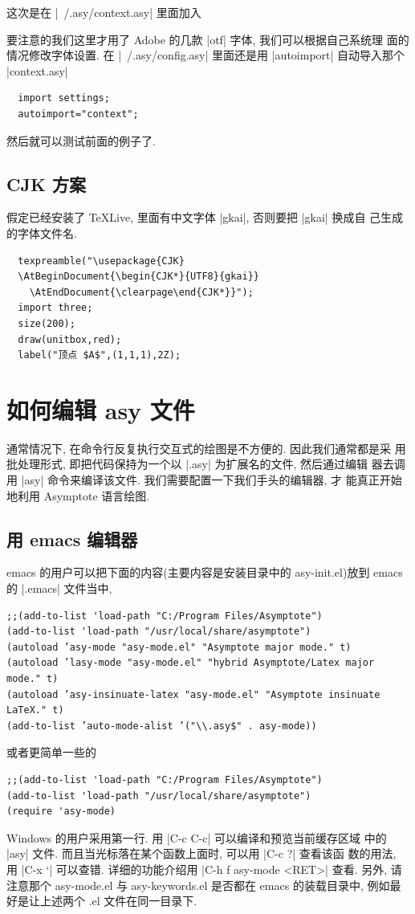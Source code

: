 \documentclass[nofonts,CJKnormalspaces]{ctexbook}
\begin{document}
这次是在 |~/.asy/context.asy| 里面加入

要注意的我们这里才用了 Adobe 的几款 |otf| 字体, 我们可以根据自己系统理
面的情况修改字体设置.
在 |~/.asy/config.asy| 里面还是用 |autoimport| 自动导入那个
|context.asy|
\begin{lstlisting}
  import settings;
  autoimport="context";
\end{lstlisting}
然后就可以测试前面的例子了.

\subsection{CJK 方案}
假定已经安装了 TeXLive, 里面有中文字体 |gkai|, 否则要把 |gkai| 换成自
己生成的字体文件名.
\begin{lstlisting}
  texpreamble("\usepackage{CJK}
  \AtBeginDocument{\begin{CJK*}{UTF8}{gkai}}
    \AtEndDocument{\clearpage\end{CJK*}}");
  import three;
  size(200);
  draw(unitbox,red);
  label("顶点 $A$",(1,1,1),2Z);
\end{lstlisting}

\section{如何编辑 asy 文件}
通常情况下, 在命令行反复执行交互式的绘图是不方便的. 因此我们通常都是采
用批处理形式, 即把代码保持为一个以 |.asy| 为扩展名的文件, 然后通过编辑
器去调用 |asy| 命令来编译该文件. 我们需要配置一下我们手头的编辑器, 才
能真正开始地利用 Asymptote 语言绘图.\label{asy:Editors}

\subsection{用 emacs 编辑器}
emacs 的用户可以把下面的内容(主要内容是安装目录中的 asy-init.el)放到 emacs
的 |.emacs| 文件当中,
\begin{verbatim}
;;(add-to-list 'load-path "C:/Program Files/Asymptote")
(add-to-list 'load-path "/usr/local/share/asymptote")
(autoload ’asy-mode "asy-mode.el" "Asymptote major mode." t)
(autoload ’lasy-mode "asy-mode.el" "hybrid Asymptote/Latex major mode." t)
(autoload ’asy-insinuate-latex "asy-mode.el" "Asymptote insinuate LaTeX." t)
(add-to-list ’auto-mode-alist ’("\\.asy$" . asy-mode))
\end{verbatim}
或者更简单一些的
\begin{verbatim}
;;(add-to-list 'load-path "C:/Program Files/Asymptote")
(add-to-list 'load-path "/usr/local/share/asymptote")
(require 'asy-mode)
\end{verbatim}
Windows 的用户采用第一行. 用 |C-c C-c| 可以编译和预览当前缓存区域
中的 |asy| 文件. 而且当光标落在某个函数上面时, 可以用 |C-c ?| 查看该函
数的用法, 用 |C-x `| 可以查错. 详细的功能介绍用 |C-h f asy-mode <RET>|
查看. 另外, 请注意那个 asy-mode.el 与 asy-keywords.el 是否都在 emacs
的装载目录中, 例如最好是让上述两个 .el 文件在同一目录下.
\end{document}
